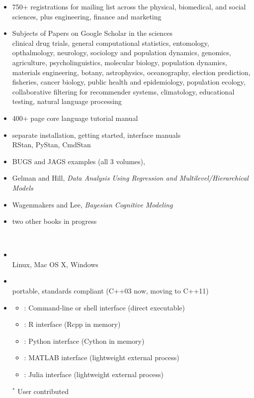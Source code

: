 \documentclass[10pt]{report}
\newcommand{\sld}[1]{\newpage{\noindent\LARGE \ \ \
    \textcolor{MidnightBlue}{\bfseries #1}}\vspace*{4pt}}
\newcommand{\spc}{\hspace*{0.25in}}
\newcommand{\myemph}[1]{{\color{MidnightBlue}{\bfseries #1}}}
\newcommand{\mypart}[2]{{\newpage 
\mbox{ }
\vfill
\noindent\spc\color{MidnightBlue}{\LARGE\bfseries #1\\[10pt]\spc\Huge{#2}}
\vfill\vfill}
\mbox{ }}
\begin{document}
\sld{Who's Using Stan?}
\begin{itemize}
\item 750+ registrations for mailing list across the physical,
biomedical, and social sciences, plus engineering, finance and marketing

\item Subjects of Papers on Google Scholar in the sciences
\\
{\footnotesize clinical drug
trials, general computational statistics, entomology, opthalmology,
neurology, sociology and population dynamics, genomics, agriculture,
psycholinguistics, molecular biology, population dynamics, materials
engineering, botany, astrophysics, oceanography, election prediction,
fisheries, cancer biology, public health and epidemiology, population
ecology, collaborative filtering for recommender systems, climatology,
educational testing, natural language processing}
\end{itemize}

\sld{Books and Model Sets}
%
\begin{itemize}
\item 400+ page core language tutorial manual
\item separate installation, getting started, interface manuals 
\\ {\footnotesize  RStan, PyStan, CmdStan}
\item BUGS and JAGS examples (all 3 volumes), 
\item Gelman and Hill, {\slshape Data Analysis Using Regression and
    Multilevel/Hierarchical Models}
\item Wagenmakers and Lee, {\slshape Bayesian Cognitive Modeling}
\item two other books in progress
\end{itemize}

\mypart{Part I}{Stan Front End}

\sld{Interface Languages}

\begin{itemize}
\item \myemph{Platforms}
\\
Linux, Mac OS X, Windows
\item \myemph{C++ API}
\\
{\footnotesize portable, standards compliant (C++03 now, moving to C++11)}
\item \myemph{Interfaces}
\vspace*{-4pt}
\begin{itemize}\footnotesize
\item \myemph{CmdStan}: Command-line or shell interface (direct executable)
\item \myemph{RStan}: R interface (Rcpp in memory)
\item \myemph{PyStan}: Python interface (Cython in memory)
\item \myemph{MStan$^*$}: MATLAB interface (lightweight external process)
\item \myemph{JuliaStan$^*$}: Julia interface (lightweight external process)
\end{itemize}
{\footnotesize ${}^*$ User contributed}
\end{itemize}
\vfill
\end{document}
